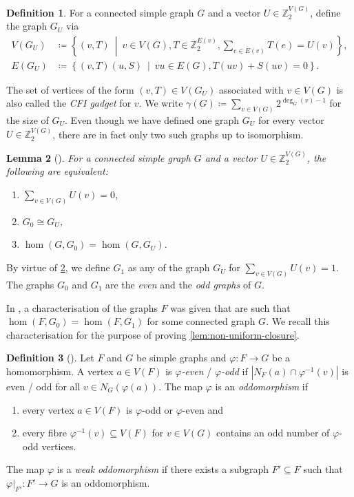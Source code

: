 \documentclass[10pt,a4paper]{article}
\theoremstyle{definition}
\newtheorem{definition}{Definition}[section]
\theoremstyle{plain}
\newtheorem{lemma}[definition]{Lemma}
\theoremstyle{remark}
\renewcommand{\phi}{\varphi}
\begin{document}
	\begin{definition} \label{def:cfi}
		For a connected simple graph $G$ and a vector $U \in \mathbb{Z}_2^{V(G)}$, define the  graph $G_U$ via
		\begin{align*}
			V(G_U) &\coloneqq \left\{(v, T) \ \middle| \ v \in V(G), T \in \mathbb{Z}_2^{E(v)}, \sum_{e \in E(v)} T(e) = U(v) \right\}, \\
			E(G_U) &\coloneqq \left\{(v, T)(u, S) \ \middle|\ vu \in E(G), T(uv) + S(uv) = 0 \right\}.
		\end{align*}
	\end{definition}
	The set of vertices of the form $(v,T) \in V(G_U)$ associated with $v \in V(G)$ is also called the \emph{CFI gadget} for $v$.
	We write $\gamma(G) \coloneqq \sum_{v\in V(G)}2^{\deg_G(v) -1}$ for the size of $G_U$.
	Even though we have defined one graph $G_U$ for every vector $U \in \mathbb{Z}_2^{V(G)}$, there are in fact only two such graphs up to isomorphism.
	\begin{lemma}[{\cite[Corollary~3.7]{roberson_oddomorphisms_2022}}] \label{lem:cfi-hom-base-graph}
		For a connected simple graph $G$ and a vector $U \in \mathbb{Z}_2^{V(G)}$, the following are equivalent:
		\begin{enumerate}
			\item $\sum_{v \in V(G)} U(v) = 0$,
			\item $G_0 \cong G_U$,
			\item $\hom(G, G_0) = \hom(G, G_U)$.
		\end{enumerate}
	\end{lemma}
	
	By virtue of \cref{lem:cfi-hom-base-graph}, we define $G_1$ as any of the graph $G_U$ for $\sum_{v\in V(G)} U(v) = 1$.
	The graphs $G_0$ and $G_1$ are the \emph{even} and the \emph{odd  graphs} of $G$.
	
	In \cite{roberson_oddomorphisms_2022}, a characterisation of the graphs $F$ was given that are such that $\hom(F, G_0) = \hom(F, G_1)$ for some connected graph $G$.
	We recall this characterisation for the purpose of proving \cref{lem:non-uniform-closure}.
	
	\begin{definition}[{\cite[Definition~3.9]{roberson_oddomorphisms_2022}}]\label{def:oddomorphism}
		Let $F$ and $G$ be simple graphs and $\phi \colon F \to G$ be a homomorphism.
		A vertex $a \in V(F)$ is \emph{$\phi$-even} / \emph{$\phi$-odd} if $|N_F(a) \cap \phi^{-1}(v)|$ is even / odd for all $v \in N_G(\phi(a))$.
		The map $\phi$ is an \emph{oddomorphism} if 
		\begin{enumerate}
			\item every vertex $a \in V(F)$ is $\phi$-odd or $\phi$-even and
			\item every fibre $\phi^{-1}(v) \subseteq V(F)$ for $v \in V(G)$ contains an odd number of $\phi$-odd vertices.
		\end{enumerate}
		The map $\phi$ is a \emph{weak oddomorphism} if there exists a subgraph $F' \subseteq F$ such that $\phi|_{F'} \colon F' \to G$ is an oddomorphism.
	\end{definition}
\end{document}
